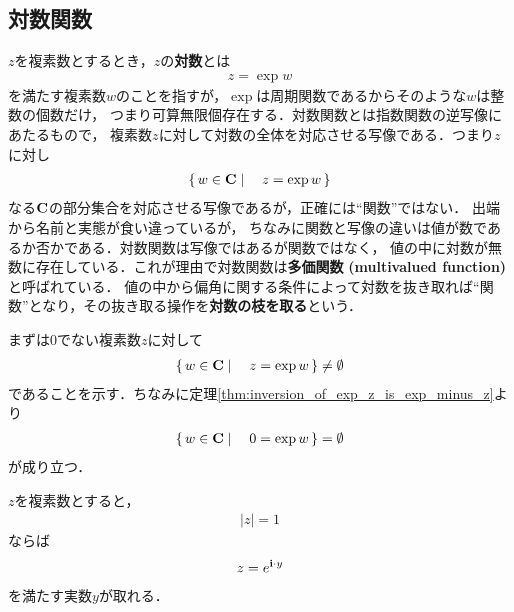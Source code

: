 \subsection{対数関数}
	
	$z$を複素数とするとき，$z$の{\bf 対数}とは
	\begin{align}
		z = \exp{w}
	\end{align}
	を満たす複素数$w$のことを指すが，$\exp$は周期関数であるからそのような$w$は整数の個数だけ，
	つまり可算無限個存在する．対数関数とは指数関数の逆写像にあたるもので，
	複素数$z$に対して対数の全体を対応させる写像である．つまり$z$に対し
	\begin{align}
		\left\{\, w \in \mathbf{C} \mid \quad z = \exp{w}\, \right\}
	\end{align}
	なる$\mathbf{C}$の部分集合を対応させる写像であるが，正確には``関数''ではない．
	出端から名前と実態が食い違っているが，
	ちなみに関数と写像の違いは値が数であるか否かである．対数関数は写像ではあるが関数ではなく，
	値の中に対数が無数に存在している．これが理由で対数関数は{\bf 多価関数}
	{\bf (multivalued function)}と呼ばれている．
	値の中から偏角に関する条件によって対数を抜き取れば``関数''となり，その抜き取る操作を{\bf 対数の枝を取る}という．
	
	まずは$0$でない複素数$z$に対して
	\begin{align}
		\left\{\, w \in \mathbf{C} \mid \quad z = \exp{w}\, \right\} \neq \emptyset
	\end{align}
	であることを示す．ちなみに定理\ref{thm:inversion_of_exp_z_is_exp_minus_z}より
	\begin{align}
		\left\{\, w \in \mathbf{C} \mid \quad 0 = \exp{w}\, \right\} = \emptyset
	\end{align}
	が成り立つ．
	
	\begin{screen}
		\begin{thm}
		\label{thm:complex_number_with_absolute_value_1_is_exp_pure_imaginary}
			$z$を複素数とすると，
			\begin{align}
				|z| = 1
			\end{align}
			ならば
			\begin{align}
				z = e^{\mathbf{i} \cdot y}
			\end{align}
			を満たす実数$y$が取れる．
		\end{thm}
	\end{screen}
	
